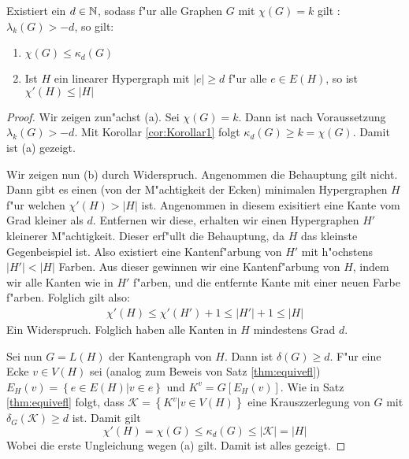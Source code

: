\begin{theorem}
  \label{thm:MainTheorem}
  Existiert ein $d\in {\mathbb{N}}$, sodass f"ur alle  Graphen $G$ mit $\chi(G) = k $ gilt : $ \lambda_{k}(G) > -d$, so gilt:
  \begin{enumerate}[label=(\alph*)]
    \item  $\chi\left( G \right)\leq \kappa_{d}\left( G \right)$
    \item  Ist $H$ ein linearer Hypergraph mit $\left|e\right| \geq d$ f"ur alle $e\in E(H)$, so ist $\chi'\left( H \right)\leq \left|H\right| $
  \end{enumerate}
\end{theorem}

\begin{proof}

    Wir zeigen zun"achst (a). Sei $\chi(G) = k$. Dann ist nach Voraussetzung $\lambda_{k}\left( G \right) > -d$. Mit Korollar \ref{cor:Korollar1} folgt $\kappa_{d}\left( G \right) \geq k = \chi\left( G \right)$. 
    Damit ist (a) gezeigt. 

    Wir zeigen nun (b) durch Widerspruch. Angenommen die Behauptung gilt nicht. Dann gibt es einen (von der M"achtigkeit der Ecken)  minimalen Hypergraphen $H$ f"ur welchen $\chi'(H) > |H|$ ist. Angenommen in diesem exisitiert eine Kante vom Grad kleiner als $d$. Entfernen wir diese, erhalten wir einen Hypergraphen $H'$ kleinerer M"achtigkeit.
      Dieser erf"ullt die Behauptung, da $H$ das kleinste Gegenbeispiel ist. Also existiert eine Kantenf"arbung von $H'$ mit h"ochstens $|H'| < |H|$ Farben. Aus dieser gewinnen wir eine Kantenf"arbung von $H$, indem wir alle Kanten wie in $H'$ f"arben, und die entfernte Kante mit einer neuen Farbe f"arben. Folglich gilt also:
      \begin{align*}
        \chi'(H) \leq \chi'(H') +1 \leq |H'|+1 \leq |H|
      \end{align*}
      Ein Widerspruch. Folglich haben alle Kanten in $H$ mindestens Grad $d$. 

      Sei nun $G=L(H)$ der Kantengraph von $H$. Dann ist $\delta(G) \geq d$. F"ur eine Ecke  $v\in V(H)$ sei (analog zum Beweis von  Satz \ref{thm:equivefl}) $E_{H}(v) = \left\{ e\in E(H) | v\in e \right\}$ und $K^{v} = G[E_{H}(v)]$. Wie in Satz \ref{thm:equivefl} folgt, dass $\mathcal{K}=\left\{ K^{v} | v \in V(H) \right\}$ eine Krauszzerlegung von $G$ mit $\delta_{G}(\mathcal{K}) \geq d$ ist. Damit gilt
      \begin{equation*}
        \chi'(H) = \chi(G) \leq \kappa_{d}(G) \leq |\mathcal{K}| = |H|
      \end{equation*}
      Wobei die erste Ungleichung wegen (a) gilt. Damit ist alles gezeigt. 
\end{proof}


